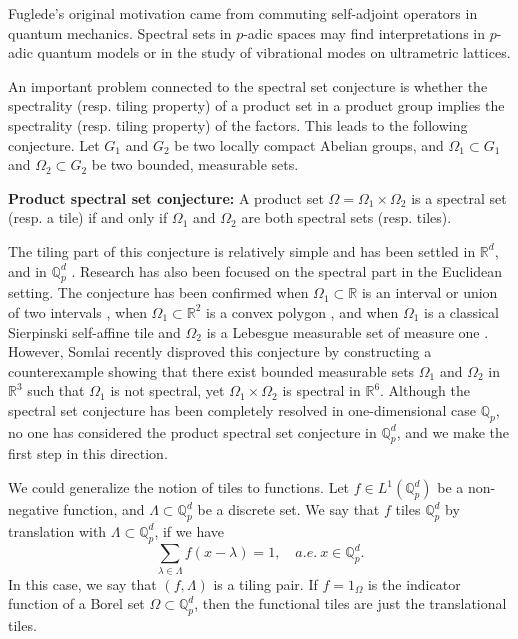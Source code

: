 \documentclass[a4paper,12pt]{amsart}
\def\Q{\mathbb{Q}}
\def\Qp{\mathbb{Q}_p}
\begin{document}
Fuglede's original motivation came from commuting self-adjoint operators in quantum mechanics. Spectral sets
in $p$-adic spaces may find interpretations in $p$-adic quantum models or in the study of vibrational modes on ultrametric lattices.



An important problem connected to the  spectral set conjecture is whether the spectrality (resp. tiling property)
of a product set in a product group implies the spectrality (resp. tiling property) of the factors.
This leads to the following conjecture. Let $ G_1$ and $G_2$ be two locally compact Abelian groups,
and $\Omega_1\subset G_1$ and $ \Omega_2\subset G_2$ be two bounded, measurable sets.

\textbf{Product spectral set conjecture:}  A product set $\Omega=\Omega_1\times\Omega_2$ is a spectral set (resp. a tile) if and only if
$\Omega_1$ and $\Omega_2$ are both spectral sets (resp. tiles).

The tiling part of this conjecture is  relatively simple and has been settled in $\mathbb{R}^d  $\cite{Kolountzakis2016},
and in $\mathbb{Q}_p^d$ \cite{K2019}.
Research has also been focused on the spectral part in the Euclidean setting.
The conjecture has been confirmed when $\Omega_1\subset\mathbb{R}$ is an interval \cite{Greenfeld-Lev2016} or
union of two intervals \cite{Kolountzakis2016}, when $\Omega_1\subset\mathbb{R}^2$ is a convex
polygon \cite{GL2020}, and when $\Omega_1$ is a classical Sierpinski self-affine tile  and $\Omega_2$
is a Lebesgue measurable set of measure one \cite{CLZ}. However, Somlai \cite{Somlai}
recently disproved this conjecture by constructing a counterexample showing that
there exist bounded measurable sets $\Omega_1$ and $\Omega_2$ in $\mathbb{R}^3$ such that
$\Omega_1$ is not spectral, yet $\Omega_1\times\Omega_2$ is spectral in $\mathbb{R}^6$.
Although the spectral set conjecture has been completely resolved in one-dimensional case $\Qp$,
no one has  considered the product spectral set conjecture in $\Qp^d$, and we make the first step in this direction.

We could generalize the  notion of tiles to functions. Let $f\in L^1(\Q_p^d)$ be a non-negative function,
and  $\Lambda\subset \Q_p^d$ be a discrete set. We say that $f$ tiles $\Q_p^d$ by translation
with $\Lambda\subset\Q_p^d$, if we have
$$
\sum_{\lambda\in\Lambda}f(x-\lambda)=1, \quad a.e.\ x\in\Q_p^d.
$$
In this case, we say that  $(f, \Lambda)$ is a tiling pair.
If $f=1_\Omega$ is the indicator function of a Borel set $\Omega\subset\Q_p^d$, then
the functional tiles are just the translational tiles.
\end{document}

